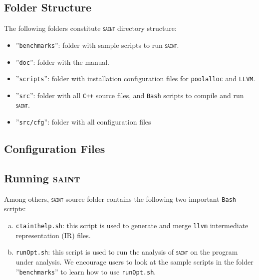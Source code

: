 \documentclass[12pt,onecolumn,a4paper]{article}
\newcommand{\saint}{\texttt{\textsc{saint}}\xspace}
\newcommand{\tool}[1]{\texttt{#1}\xspace}
\begin{document}
\subsection{Folder Structure}
The following folders constitute \saint directory structure:
\begin{itemize}
	\item ''\texttt{benchmarks}'': folder with sample
	scripts to run \saint.

	\item ''\texttt{doc}'': folder with the manual.

	\item ''\texttt{scripts}'': folder with installation
	configuration files for \tool{poolalloc} and \tool{LLVM}.
	
	\item ''\texttt{src}'': folder with all \texttt{C++} source files,
	and \tool{Bash} scripts to compile and run \saint.

	\item ''\texttt{src/cfg}'': folder with all configuration files			
\end{itemize}

\subsection{Configuration Files}

\subsection{Running \textsc{saint}}
Among others, \saint source folder contains the following two important
\texttt{Bash} scripts:
\begin{enumerate}[a)]
	\item \texttt{ctainthelp.sh}: this script is used to generate and
		merge \tool{llvm} intermediate representation (IR) files. 
	
	\item \texttt{runOpt.sh}: this script is used to run the analysis of
		\saint on the program under analysis. We encourage users to look
		at the sample scripts in the folder ''\texttt{benchmarks}'' to
		learn how to use \texttt{runOpt.sh}.
\end{enumerate}




\end{document}
